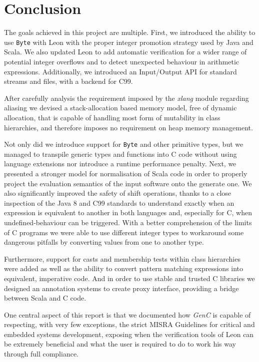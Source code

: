 \documentclass[a4paper,twoside]{article}
\newcommand{\InlineS}[1]{\lstinline[language=Leon]|#1|}
\let\oldsection\section
\renewcommand\section{\cleardoublepage\oldsection}
\newcommand{\GenC}{\emph{GenC}\xspace}
\begin{document}
\section{Conclusion}
\label{conclusion}

The goals achieved in this project are multiple. First, we introduced the
ability to use \InlineS{Byte} with Leon with the proper integer promotion
strategy used by Java and Scala. We also updated Leon to add automatic
verification for a wider range of potential integer overflows and to detect
unexpected behaviour in arithmetic expressions. Additionally, we introduced
an Input/Output API for standard streams and files, with a backend for C99.

After carefully analysis the requirement imposed by the \emph{xlang} module
regarding aliasing we devised a stack-allocation based memory model, free of
dynamic allocation, that is capable of handling most form of mutability in class
hierarchies, and therefore imposes no requirement on heap memory management.

Not only did we introduce support for \InlineS{Byte} and other primitive types,
but we managed to transpile generic types and functions into C code without
using language extensions nor introduce a runtime performance penalty. Next, we
presented a stronger model for normalisation of Scala code in order to properly
project the evaluation semantics of the input software onto the generate one. We
also significantly improved the safety of shift operations, thanks to a close
inspection of the Java 8 and C99 standards to understand exactly when an
expression is equivalent to another in both languages and, especially for C,
when undefined-behaviour can be triggered. With a better comprehension of the
limits of C programs we were able to use different integer types to workaround
some dangerous pitfalls by converting values from one to another type.

Furthermore, support for casts and membership tests within class hierarchies
were added as well as the ability to convert pattern matching expressions into
equivalent, imperative code. And in order to use stable and trusted C libraries
we designed an annotation systems to create proxy interface, providing a bridge
between Scala and C code.

One central aspect of this report is that we documented how \GenC is capable of
respecting, with very few exceptions, the strict MISRA Guidelines for critical
and embedded systems development, exposing when the verification tools of Leon
can be extremely beneficial and what the user is required to do to work his way
through full compliance.
\end{document}
